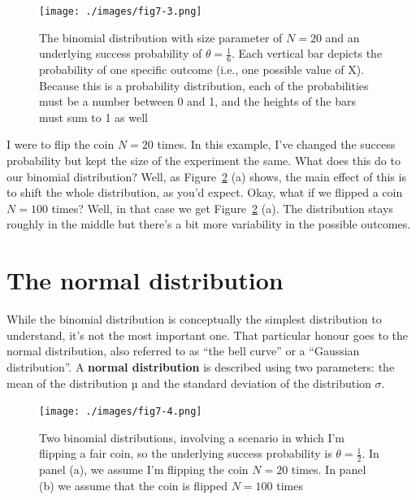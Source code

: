 \documentclass[
  letterpaper,
]{book}
\begin{document}
\begin{figure}

\texttt{[image: ./images/fig7-3.png]} \hfill{}

\caption{\label{fig-fig7-3}The binomial distribution with size parameter
of \(N = 20\) and an underlying success probability of
\(\theta = \frac{1}{6}\). Each vertical bar depicts the probability of
one specific outcome (i.e., one possible value of X). Because this is a
probability distribution, each of the probabilities must be a number
between 0 and 1, and the heights of the bars must sum to 1 as well}

\end{figure}

I were to flip the coin \(N = 20\) times. In this example, I've changed
the success probability but kept the size of the experiment the same.
What does this do to our binomial distribution? Well, as
Figure~\ref{fig-fig7-4} (a) shows, the main effect of this is to shift
the whole distribution, as you'd expect. Okay, what if we flipped a coin
\(N = 100\) times? Well, in that case we get Figure~\ref{fig-fig7-4}
(a). The distribution stays roughly in the middle but there's a bit more
variability in the possible outcomes.

\hypertarget{sec-The-normal-distribution}{%
\section{The normal distribution}\label{sec-The-normal-distribution}}

While the binomial distribution is conceptually the simplest
distribution to understand, it's not the most important one. That
particular honour goes to the normal distribution, also referred to as
``the bell curve'' or a ``Gaussian distribution''. A \textbf{normal
distribution} is described using two parameters: the mean of the
distribution µ and the standard deviation of the distribution
\(\sigma\).

\begin{figure}

\texttt{[image: ./images/fig7-4.png]} \hfill{}

\caption{\label{fig-fig7-4}Two binomial distributions, involving a
scenario in which I'm flipping a fair coin, so the underlying success
probability is \(\theta = \frac{1}{2}\). In panel (a), we assume I'm
flipping the coin \(N = 20\) times. In panel (b) we assume that the coin
is flipped \(N = 100\) times}

\end{figure}
\end{document}
